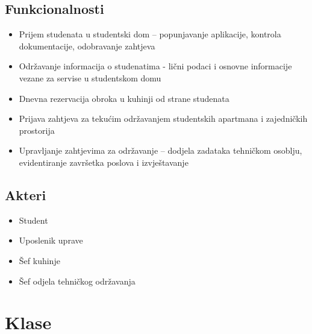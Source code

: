 \documentclass{article}
\begin{document}
\subsection*{Funkcionalnosti}
\begin{itemize}
  \item Prijem studenata u studentski dom – popunjavanje aplikacije, kontrola dokumentacije, odobravanje zahtjeva
  \item Održavanje informacija o studenatima - lični podaci i osnovne informacije vezane za servise u studentskom domu
  \item Dnevna rezervacija obroka u kuhinji od strane studenata
  \item Prijava zahtjeva za tekućim održavanjem studentskih apartmana i zajedničkih prostorija
  \item Upravljanje zahtjevima za održavanje – dodjela zadataka tehničkom osoblju, evidentiranje završetka poslova i izvještavanje
  
\end{itemize}

\subsection*{Akteri}
\begin{itemize}
    \item Student
    \item Uposlenik uprave
    \item Šef kuhinje
    \item Šef odjela tehničkog održavanja
\end{itemize}


\medskip 

\newpage

\section{Klase}
\end{document}
